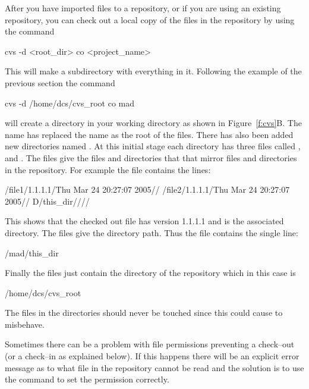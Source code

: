 After you have imported files to a \cvs repository, or if you are using
an existing repository, you can check out a local copy of the files in the
repository by using the command
\begin{example}
  cvs -d <root_dir> co <project_name>
\end{example}
This will make a subdirectory  with everything in it.
Following the example of the previous section the command
\begin{example}
  cvs -d /home/dcs/cvs_root co mad
\end{example}
will create a  directory in your working directory as shown in
Figure~\ref{f:cvs}B. The name  has replaced the name
 as the root of the files. There has also been added
new directories named . At this initial stage each \cvs
directory has three files called ,  and
. The  files give the files and directories that
\cvs that mirror files and directories in the \cvs repository. For
example the file  contains the lines:
\begin{example}
  /file1/1.1.1.1/Thu Mar 24 20:27:07 2005//
  /file2/1.1.1.1/Thu Mar 24 20:27:07 2005//
  D/this_dir////
\end{example}
This shows that the checked out  file has version 1.1.1.1
and  is the associated directory. The  files
give the directory path. Thus the file 
contains the single line:
\begin{example}
  /mad/this_dir
\end{example}
Finally the  files just contain the directory of the
repository which in this case is
\begin{example}
  /home/dcs/cvs_root
\end{example}
The files in the \cvs directories should never be touched since
this could cause \cvs to misbehave. 

Sometimes there can be a problem with file permissions preventing a
check--out (or a check--in as explained below). If this happens there
will be an explicit error message as to what file in the repository
cannot be read and the solution is to use the  command to
set the permission correctly.

